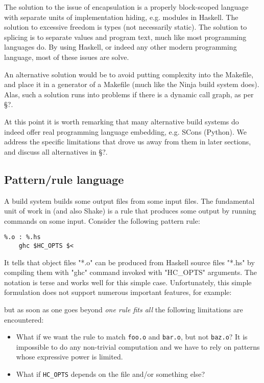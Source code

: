 The solution to the issue of encapsulation is a properly block-scoped language with separate units of implementation hiding, e.g. modules in Haskell. The solution to excessive freedom is types (not necessarily static). The solution to splicing is to separate values and program text, much like most programming languages do. By using Haskell, or indeed any other modern programming language, most of these issues are solve.

An alternative solution would be to avoid putting complexity into the Makefile, and place it in a generator of a Makefile (much like the Ninja build system does). Alas, such a solution runs into problems if there is a dynamic call graph, as per \S?.

At this point it is worth remarking that many alternative build systems do indeed offer real programming language embedding, e.g. SCons (Python). We address the specific limitations that drove us away from them in later sections, and discuss all alternatives in \S?.

\subsection{Pattern/rule language}

A build system builds some output files from some input files. The fundamental unit of work in \make{} (and also Shake) is a rule that produces some output by running commands on some input. Consider the following pattern rule:

\begin{lstlisting}
%.o : %.hs
    ghc $HC_OPTS $<
\end{lstlisting}

\noindent It tells \make{} that object files \lst"*.o" can be produced from Haskell source files \lst"*.hs" by compiling them with \lst"ghc" command invoked with \lst"HC_OPTS" arguments. The notation is terse and works well for this simple case. Unfortunately, this simple formulation does not support numerous important features, for example:


 but as soon as one goes beyond \textit{one rule
fits all} the following limitations are encountered:
\begin{itemize}
  \item What if we want the rule to match \texttt{foo.o} and \texttt{bar.o}, but
  not \texttt{baz.o}? It is impossible to do any non-trivial computation and
  we have to rely on patterns whose expressive power is limited.
  \item What if \texttt{HC\_OPTS} depends on the file and/or something else?
\end{itemize}

